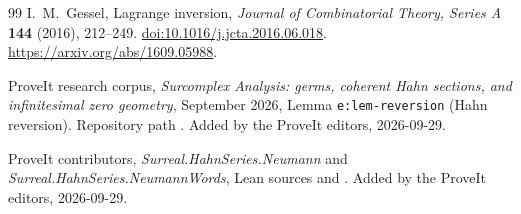 \documentclass[11pt,a4paper]{article}
\theoremstyle{definition}
\theoremstyle{remark}
\begin{document}
\begin{thebibliography}{99}
I.~M.~Gessel, Lagrange inversion,
\emph{Journal of Combinatorial Theory, Series A} \textbf{144} (2016),
212--249.
\href{https://doi.org/10.1016/j.jcta.2016.06.018}{doi:10.1016/j.jcta.2016.06.018}.
\url{https://arxiv.org/abs/1609.05988}.

ProveIt research corpus, \emph{Surcomplex Analysis: germs, coherent Hahn
sections, and infinitesimal zero geometry}, September 2026,
Lemma \texttt{e:lem-reversion} (Hahn reversion).
Repository path
.
Added by the ProveIt editors, 2026-09-29.

ProveIt contributors, \emph{Surreal.HahnSeries.Neumann} and
\emph{Surreal.HahnSeries.NeumannWords}, Lean sources
 and
.
Added by the ProveIt editors, 2026-09-29.
\end{thebibliography}
\endgroup
\end{document}

